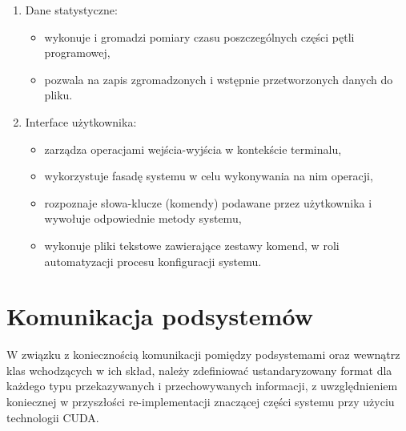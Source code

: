 \begin{enumerate}
\begin{itemize}
        \end{itemize}
    \item Dane statystyczne:
        \begin{itemize}
            \item wykonuje i gromadzi pomiary czasu poszczególnych części pętli programowej,
            \item pozwala na zapis zgromadzonych i wstępnie przetworzonych danych do pliku.
        \end{itemize}
    \item Interface użytkownika:
        \begin{itemize}
            \item zarządza operacjami wejścia-wyjścia w kontekście terminalu,
            \item wykorzystuje fasadę systemu w celu wykonywania na nim operacji,
            \item rozpoznaje słowa-klucze (komendy) podawane przez użytkownika i wywołuje odpowiednie metody systemu,
            \item wykonuje pliki tekstowe zawierające zestawy komend, w roli automatyzacji procesu konfiguracji systemu.
        \end{itemize}
\end{enumerate}

\section{Komunikacja podsystemów}
W związku z koniecznością komunikacji pomiędzy podsystemami oraz wewnątrz klas wchodzących w ich skład, należy zdefiniować ustandaryzowany format dla każdego typu przekazywanych i przechowywanych informacji, z uwzględnieniem koniecznej w przyszłości re-implementacji znaczącej części systemu przy użyciu technologii CUDA\cite{bib:CUDA}.


